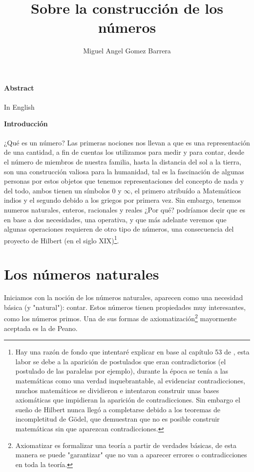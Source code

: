 \documentclass{article}
\title{Sobre la construcción de los números}
\author{Miguel Angel Gomez Barrera}
\begin{document}
\maketitle

\begin{center}\textbf{Abstract}\end{center}
\paragraph{} In English

\begin{center}\textbf{Introducción}\end{center}

\paragraph{} ¿Qué es un número? Las primeras nociones nos llevan a que es una representación de una cantidad, a fin de cuentas los utilizamos para medir y para contar, desde el número de miembros de nuestra familia, hasta la distancia del sol a la tierra, son una construcción valiosa para la humanidad, tal es la fascinación de algunas personas por estos objetos que tenemos representaciones del concepto de nada y del todo, ambos tienen un símbolos 0 y $\infty$, el primero atribuído a Matemáticos indios y el segundo debido a los griegos por primera vez. Sin embargo, tenemos numeros naturales, enteros, racionales y reales ¿Por qué? podríamos decir que es en base a dos necesidades, una operativa, y que más adelante veremos que algunas operaciones requieren de otro tipo de números, una consecuencia del proyecto de Hilbert (en el siglo XIX)\footnote{Hay una razón de fondo que intentaré explicar en base al capítulo 53 de \cite{morris_kline_pensamiento_1972}, esta labor se debe a la aparición de postulados que eran contradictorios (el postulado de las paralelas por ejemplo), durante la época se tenía a las matemáticas como una verdad inquebrantable, al evidenciar contradicciones, muchos matemáticos se dividieron e intentaron construir unas bases axiomáticas que impidieran la aparición de contradicciones. Sin embargo el sueño de Hilbert nunca llegó a completarse debido a los teoremas de incompletitud de Gödel, que demuestran que no es posible construir matemáticas sin que aparezcan contradicciones.
}.

\section{Los números naturales}
Iniciamos con la noción de los números naturales, aparecen como una necesidad básica (y "natural"): contar. Estos números tienen propiedades muy interesantes, como los números primos. Una de sus formas de axiomatización\footnote{Axiomatizar es formalizar una teoría a partir de verdades básicas, de esta manera se puede "garantizar" que no van a aparecer errores o contradicciones en toda la teoría.} mayormente aceptada es la de Peano.
\end{document}
